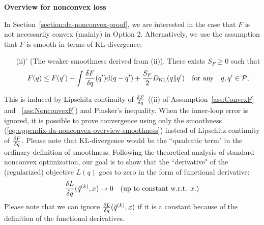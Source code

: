 \textbf{Overview for nonconvex loss}

In Section~\ref{section:da-nonconvex-proof}, we are interested in the case that $F$ is not necessarily convex (mainly) in Option 2. 
Alternatively, we use the assumption that $F$ is smooth in terms of KL-divergence:
\begin{itemize}
\item[(ii)'] (The weaker smoothness derived from (ii)). There exists $S_F \geq 0$ such that 
\begin{equation}
    F(q) \leq F(q') + \int \frac{\delta F}{\delta q}(q')\mathrm{d}(q-q') + \frac{S_F}{2}D_{\mathrm{KL}}(q\|q') \quad \text{for any}\quad  q,q' \in {\mathcal{P}}, \label{eq:appendix-da-nonconvex-overview-smoothness}
\end{equation}
\end{itemize}
This is induced by Lipschitz continuity of $\frac{\delta F}{\delta q}$ ((ii) of Assumption~\ref{ass:ConvexF} and ~\ref{ass:NonconvexF}) and Pinsker's inequality. When the inner-loop error is ignored, it is possible to prove convergence using only the smoothness (\ref{eq:appendix-da-nonconvex-overview-smoothness}) instead of Lipschitz continuity of $\frac{\delta F}{\delta q}$.
Please note that KL-divergence would be the ``quadratic term" in the ordinary definition of  smoothness.
Following the theoretical analysis of standard nonconvex optimization, our goal is to show that the ``derivative" of the (regularized) objective $L(q)$ goes to zero in the form of functional derivative:
\begin{equation}
    \frac{\delta L}{\delta q}(\hat{q}^{(k)},x) \to 0 \quad \text{(up to constant w.r.t. $x$.)}
\end{equation}
Please note that we can ignore $\frac{\delta L}{\delta q}(\hat{q}^{(k)},x)$ if it is a constant because of the definition of the functional derivatives. 
% 

